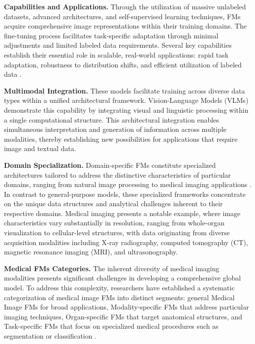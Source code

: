 \textbf{Capabilities and Applications.} Through the utilization of massive unlabeled datasets, advanced architectures, and self-supervised learning techniques, FMs acquire comprehensive image representations within their training domains. The fine-tuning process facilitates task-specific adaptation through minimal adjustments and limited labeled data requirements. Several key capabilities establish their essential role in scalable, real-world applications: rapid task adaptation, robustness to distribution shifts, and efficient utilization of labeled data \cite{zhou_foundation_2023, azizi_robust_2023, lu_towards_2023, tu_towards_2023}.

\textbf{Multimodal Integration.} These models facilitate training across diverse data types within a unified architectural framework. Vision-Language Models (VLMs) \cite{radford_learning_2021} demonstrate this capability by integrating visual and linguistic processing within a single computational structure. This architectural integration enables simultaneous interpretation and generation of information across multiple modalities, thereby establishing new possibilities for applications that require image and textual data.

\textbf{Domain Specialization.} Domain-specific FMs constitute specialized architectures tailored to address the distinctive characteristics of particular domains, ranging from natural image processing \cite{oquab_dinov2_2024} to medical imaging applications \cite{lu_towards_2023, azizi_robust_2023}. In contrast to general-purpose models, these specialized frameworks concentrate on the unique data structures and analytical challenges inherent to their respective domains. Medical imaging presents a notable example, where image characteristics vary substantially in resolution, ranging from whole-organ visualization to cellular-level structures, with data originating from diverse acquisition modalities including X-ray radiography, computed tomography (CT), magnetic resonance imaging (MRI), and ultrasonography.

\textbf{Medical FMs Categories.}  The inherent diversity of medical imaging modalities presents significant challenges in developing a comprehensive global model. To address this complexity, researchers have established a systematic categorization of medical image FMs into distinct segments: general Medical Image FMs for broad applications, Modality-specific FMs that address particular imaging techniques, Organ-specific FMs that target anatomical structures, and Task-specific FMs that focus on specialized medical procedures such as segmentation or classification \cite{zhang_challenges_2023}.